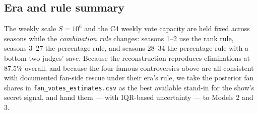 \documentclass[11pt]{article}
\begin{document}
\subsection{Era and rule summary}

The weekly scale $S = 10^6$ and the C4 weekly vote capacity are held fixed across seasons
while the \emph{combination rule} changes: seasons 1--2 use the rank rule, seasons 3--27
the percentage rule, and seasons 28--34 the percentage rule with a bottom-two judges'
save. Because the reconstruction reproduces eliminations at $87.5\%$ overall, and because
the four famous controversies above are all consistent with documented fan-side rescue
under their era's rule, we take the posterior fan shares in
\texttt{fan\_votes\_estimates.csv} as the best available stand-in for the show's secret
signal, and hand them --- with IQR-based uncertainty --- to Models 2 and 3.






\end{document}
